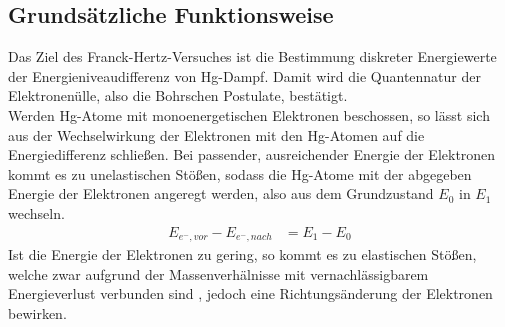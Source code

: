 \subsection{Grundsätzliche Funktionsweise}
Das Ziel des Franck-Hertz-Versuches ist die Bestimmung diskreter Energiewerte der Energieniveaudifferenz
von Hg-Dampf. Damit wird die Quantennatur der Elektronenülle, also die Bohrschen Postulate, bestätigt.\\
Werden Hg-Atome mit monoenergetischen Elektronen beschossen, so lässt sich aus der Wechselwirkung 
der Elektronen mit den Hg-Atomen auf die Energiedifferenz schließen. Bei passender, ausreichender
Energie der Elektronen kommt es zu unelastischen Stößen, sodass die Hg-Atome mit der abgegeben Energie 
der Elektronen angeregt werden, also aus dem Grundzustand $E_0$ in $E_1$ wechseln.
\begin{align}
E_{e^- , vor} - E_{e^- , nach} &= E_1 - E_0 \label{eqanreg}
\end{align}
Ist die Energie der Elektronen zu gering, so kommt es zu elastischen Stößen, welche zwar 
aufgrund der Massenverhälnisse mit 
vernachlässigbarem Energieverlust verbunden sind \cite{anleitung}, jedoch eine Richtungsänderung
der Elektronen bewirken.
